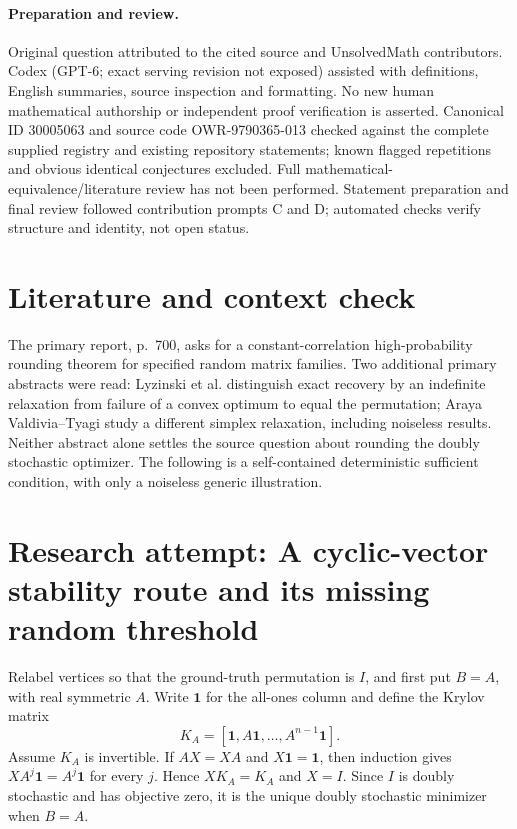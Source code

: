 \documentclass[11pt]{article}
\begin{document}
\paragraph{Preparation and review.}
Original question attributed to the cited source and UnsolvedMath contributors. Codex (GPT-6; exact serving revision not exposed) assisted with definitions, English summaries, source inspection and formatting. No new human mathematical authorship or independent proof verification is asserted. Canonical ID 30005063 and source code OWR-9790365-013 checked against the complete supplied registry and existing repository statements; known flagged repetitions and obvious identical conjectures excluded. Full mathematical-equivalence/literature review has not been performed. Statement preparation and final review followed contribution prompts C and D; automated checks verify structure and identity, not open status.
\label{end:30005063}

\section{Literature and context check}
The primary report, p.~700, asks for a constant-correlation high-probability rounding theorem for specified random matrix families. Two additional primary abstracts were read: Lyzinski et al. distinguish exact recovery by an indefinite relaxation from failure of a convex optimum to equal the permutation; Araya Valdivia--Tyagi study a different simplex relaxation, including noiseless results. Neither abstract alone settles the source question about rounding the doubly stochastic optimizer. The following is a self-contained deterministic sufficient condition, with only a noiseless generic illustration.
\section{Research attempt: A cyclic-vector stability route and its missing random threshold}
Relabel vertices so that the ground-truth permutation is $I$, and first put $B=A$, with real symmetric $A$. Write $\mathbf1$ for the all-ones column and define the Krylov matrix
\[
 K_A=[\mathbf1,A\mathbf1,\ldots,A^{n-1}\mathbf1].
\]
Assume $K_A$ is invertible. If $AX=XA$ and $X\mathbf1=\mathbf1$, then induction gives $XA^j\mathbf1=A^j\mathbf1$ for every $j$. Hence $XK_A=K_A$ and $X=I$. Since $I$ is doubly stochastic and has objective zero, it is the unique doubly stochastic minimizer when $B=A$.
\end{document}
